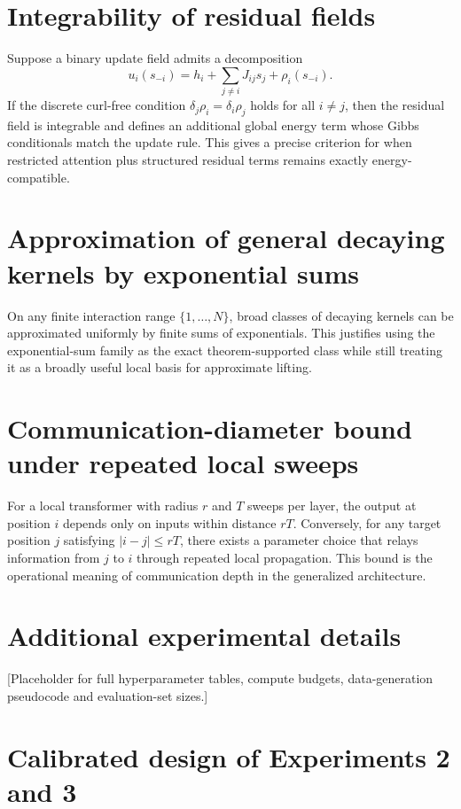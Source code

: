 \documentclass[11pt]{article}
\theoremstyle{definition}
\begin{document}
\section{Integrability of residual fields}

Suppose a binary update field admits a decomposition
\[
u_i(s_{-i})=h_i+\sum_{j\neq i}J_{ij}s_j+\rho_i(s_{-i}).
\]
If the discrete curl-free condition \(\delta_j\rho_i=\delta_i\rho_j\) holds for all \(i\neq j\), then the residual field is integrable and defines an additional global energy term whose Gibbs conditionals match the update rule. This gives a precise criterion for when restricted attention plus structured residual terms remains exactly energy-compatible.

\section{Approximation of general decaying kernels by exponential sums}

On any finite interaction range \(\{1,\dots,N\}\), broad classes of decaying kernels can be approximated uniformly by finite sums of exponentials. This justifies using the exponential-sum family as the exact theorem-supported class while still treating it as a broadly useful local basis for approximate lifting.

\section{Communication-diameter bound under repeated local sweeps}

For a local transformer with radius \(r\) and \(T\) sweeps per layer, the output at position \(i\) depends only on inputs within distance \(rT\). Conversely, for any target position \(j\) satisfying \(|i-j|\le rT\), there exists a parameter choice that relays information from \(j\) to \(i\) through repeated local propagation. This bound is the operational meaning of communication depth in the generalized architecture.

\section{Additional experimental details}

[Placeholder for full hyperparameter tables, compute budgets, data-generation pseudocode and evaluation-set sizes.]

\section{Calibrated design of Experiments 2 and 3}
\end{document}
